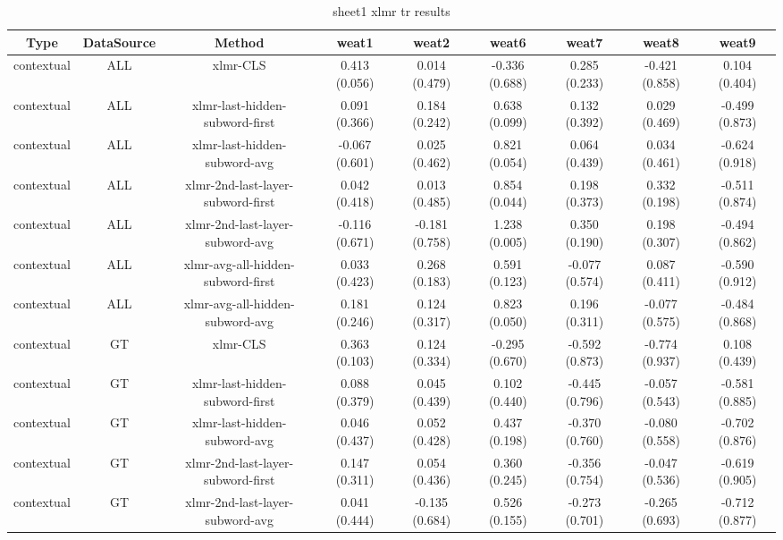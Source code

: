 \begin{sidewaystable}[htb]
    \centering
    \caption{sheet1 xlmr tr results}
    \label{appendix_tab:sheet1_xlmr_tr_results}
    \small
    \begin{tabular}{@{}ccccccccc@{}}
        \toprule
        Type & DataSource & Method & weat1 & weat2 & weat6 & weat7 & weat8 & weat9 \\
        \midrule
        contextual & ALL & xlmr-CLS & 0.413 (0.056) & 0.014 (0.479) & -0.336 (0.688) & 0.285 (0.233) & -0.421 (0.858) & 0.104 (0.404) \\
        contextual & ALL & xlmr-last-hidden-subword-first & 0.091 (0.366) & 0.184 (0.242) & 0.638 (0.099) & 0.132 (0.392) & 0.029 (0.469) & -0.499 (0.873) \\
        contextual & ALL & xlmr-last-hidden-subword-avg & -0.067 (0.601) & 0.025 (0.462) & 0.821 (0.054) & 0.064 (0.439) & 0.034 (0.461) & -0.624 (0.918) \\
        contextual & ALL & xlmr-2nd-last-layer-subword-first & 0.042 (0.418) & 0.013 (0.485) & 0.854 (0.044) & 0.198 (0.373) & 0.332 (0.198) & -0.511 (0.874) \\
        contextual & ALL & xlmr-2nd-last-layer-subword-avg & -0.116 (0.671) & -0.181 (0.758) & 1.238 (0.005) & 0.350 (0.190) & 0.198 (0.307) & -0.494 (0.862) \\
        contextual & ALL & xlmr-avg-all-hidden-subword-first & 0.033 (0.423) & 0.268 (0.183) & 0.591 (0.123) & -0.077 (0.574) & 0.087 (0.411) & -0.590 (0.912) \\
        contextual & ALL & xlmr-avg-all-hidden-subword-avg & 0.181 (0.246) & 0.124 (0.317) & 0.823 (0.050) & 0.196 (0.311) & -0.077 (0.575) & -0.484 (0.868) \\
        contextual & GT & xlmr-CLS & 0.363 (0.103) & 0.124 (0.334) & -0.295 (0.670) & -0.592 (0.873) & -0.774 (0.937) & 0.108 (0.439) \\
        contextual & GT & xlmr-last-hidden-subword-first & 0.088 (0.379) & 0.045 (0.439) & 0.102 (0.440) & -0.445 (0.796) & -0.057 (0.543) & -0.581 (0.885) \\
        contextual & GT & xlmr-last-hidden-subword-avg & 0.046 (0.437) & 0.052 (0.428) & 0.437 (0.198) & -0.370 (0.760) & -0.080 (0.558) & -0.702 (0.876) \\
        contextual & GT & xlmr-2nd-last-layer-subword-first & 0.147 (0.311) & 0.054 (0.436) & 0.360 (0.245) & -0.356 (0.754) & -0.047 (0.536) & -0.619 (0.905) \\
        contextual & GT & xlmr-2nd-last-layer-subword-avg & 0.041 (0.444) & -0.135 (0.684) & 0.526 (0.155) & -0.273 (0.701) & -0.265 (0.693) & -0.712 (0.877) \\

\end{tabular}
\end{sidewaystable}
